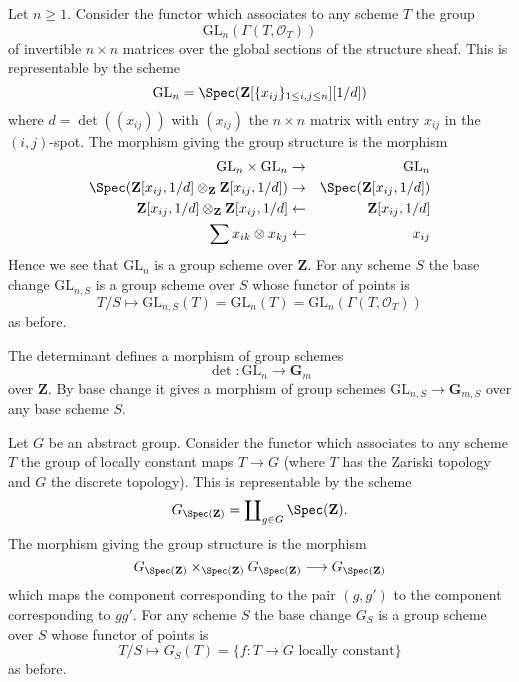 \begin{example}
\label{example-general-linear-group}
Let $n \geq 1$.
Consider the functor which associates
to any scheme $T$ the group
$$
\text{GL}_n(\Gamma(T, \mathcal{O}_T))
$$
of invertible $n \times n$ matrices over
the global sections of the structure sheaf.
This is representable by the scheme
$$
\text{GL}_n = \Spec(\mathbf{Z}[\{x_{ij}\}_{1 \leq i, j \leq n}][1/d])
$$
where $d = \det((x_{ij}))$ with $(x_{ij})$ the $n \times n$ matrix
with entry $x_{ij}$ in the $(i, j)$-spot.
The morphism giving the group structure is the morphism
\begin{eqnarray*}
\text{GL}_n \times \text{GL}_n & \to & \text{GL}_n \\
\Spec(\mathbf{Z}[x_{ij}, 1/d] \otimes_{\mathbf{Z}}
\mathbf{Z}[x_{ij}, 1/d])
& \to &
\Spec(\mathbf{Z}[x_{ij}, 1/d]) \\
\mathbf{Z}[x_{ij}, 1/d] \otimes_{\mathbf{Z}} \mathbf{Z}[x_{ij}, 1/d]
& \leftarrow &
\mathbf{Z}[x_{ij}, 1/d] \\
\sum x_{ik} \otimes x_{kj} & \leftarrow & x_{ij}
\end{eqnarray*}
Hence we see that $\text{GL}_n$ is a group scheme over $\mathbf{Z}$.
For any scheme $S$ the base change $\text{GL}_{n, S}$ is a
group scheme over $S$ whose functor of points is
$$
T/S
\longmapsto
\text{GL}_{n, S}(T) = \text{GL}_n(T) =\text{GL}_n(\Gamma(T, \mathcal{O}_T))
$$
as before.
\end{example}

\begin{example}
\label{example-determinant}
The determinant defines a morphism of group schemes
$$
\det : \text{GL}_n \longrightarrow \mathbf{G}_m
$$
over $\mathbf{Z}$. By base change it gives a morphism
of group schemes $\text{GL}_{n, S} \to \mathbf{G}_{m, S}$
over any base scheme $S$.
\end{example}

\begin{example}
\label{example-constant-group}
Let $G$ be an abstract group. Consider the functor
which associates to any scheme $T$ the group
of locally constant maps $T \to G$ (where $T$ has the Zariski topology
and $G$ the discrete topology). This is representable by the scheme
$$
G_{\Spec(\mathbf{Z})} =
\coprod\nolimits_{g \in G} \Spec(\mathbf{Z}).
$$
The morphism giving the group structure is the morphism
$$
G_{\Spec(\mathbf{Z})}
\times_{\Spec(\mathbf{Z})}
G_{\Spec(\mathbf{Z})}
\longrightarrow
G_{\Spec(\mathbf{Z})}
$$
which maps the component corresponding to the pair $(g, g')$ to the
component corresponding to $gg'$. For any scheme $S$ the base change
$G_S$ is a group scheme over $S$ whose functor of points is
$$
T/S
\longmapsto
G_S(T) = \{f : T \to G \text{ locally constant}\}
$$
as before.
\end{example}





